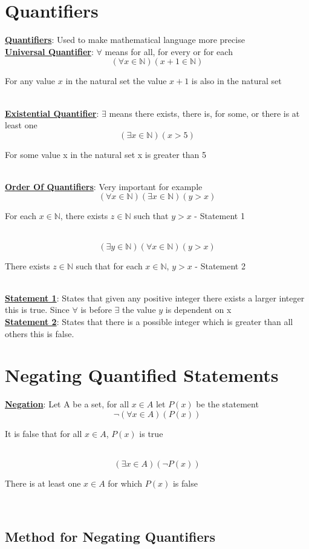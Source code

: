 \documentclass[12pt]{article}
\newcommand{\defline}[2]{\noindent\textbf{\underline{#1}}: #2\\}
\newcommand{\example}[2]{
    \begin{equation}
        #1
    \end{equation}\caption{#2}\\
}
\begin{document}
    \section{Quantifiers}

        \defline{Quantifiers}{Used to make mathematical language more precise}

        \defline{Universal Quantifier}{$\forall$ means for all, for every or for each}

        \example{(\forall x \in \mathbb{N})(x+1\in \mathbb{N})}{For any value $x$ in the natural set the value $x+1$ is also in the natural set}

        \defline{Existential Quantifier}{$\exists$ means there exists, there is, for some, or there is at least one}

        \example{(\exists x\in\mathbb{N})(x > 5)}{For some value x in the natural set x is greater than 5}

        \defline{Order Of Quantifiers}{Very important for example}

        \example{(\forall x \in \mathbb{N})(\exists x\in \mathbb{N})(y>x)}{For each $x\in\mathbb{N}$, there exists $z\in\mathbb{N}$ such that $y>x$ - Statement 1}

        \example{(\exists y\in\mathbb{N})(\forall x\in\mathbb{N})(y>x)}{There exists $z\in\mathbb{N}$ such that for each $x\in\mathbb{N}$, $y>x$ - Statement 2}

        \defline{Statement 1}{States that given any positive integer there exists a larger integer this is true. Since $\forall$ is before $\exists$ the value $y$ is dependent on x}

        \defline{Statement 2}{States that there is a possible integer which is greater than all others this is false.}
    \endsection

    \section{Negating Quantified Statements}
        \defline{Negation}{Let A be a set, for all $x\in A$ let $P(x)$ be the statement}

        \example{\neg(\forall x \in A)(P(x))}{It is false that for all $x\in A$, $P(x)$ is true}

        \example{(\exists x \in A)(\neg P(x))}{There is at least one $x\in A$ for which $P(x)$ is false}

        \subsection{Method for Negating Quantifiers}
\end{document}
